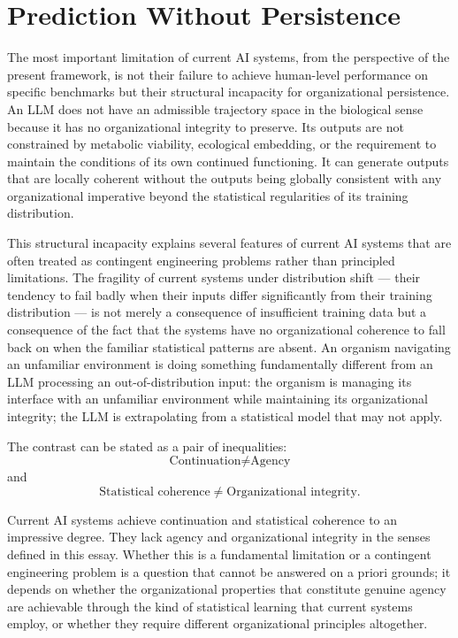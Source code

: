 \documentclass[12pt,a4paper]{report}
\theoremstyle{flyxion}
\begin{document}
\section{Prediction Without Persistence}

The most important limitation of current AI systems, from the perspective of the present framework, is not their failure to achieve human-level performance on specific benchmarks but their structural incapacity for organizational persistence. An LLM does not have an admissible trajectory space in the biological sense because it has no organizational integrity to preserve. Its outputs are not constrained by metabolic viability, ecological embedding, or the requirement to maintain the conditions of its own continued functioning. It can generate outputs that are locally coherent without the outputs being globally consistent with any organizational imperative beyond the statistical regularities of its training distribution.

This structural incapacity explains several features of current AI systems that are often treated as contingent engineering problems rather than principled limitations. The fragility of current systems under distribution shift --- their tendency to fail badly when their inputs differ significantly from their training distribution --- is not merely a consequence of insufficient training data but a consequence of the fact that the systems have no organizational coherence to fall back on when the familiar statistical patterns are absent. An organism navigating an unfamiliar environment is doing something fundamentally different from an LLM processing an out-of-distribution input: the organism is managing its interface with an unfamiliar environment while maintaining its organizational integrity; the LLM is extrapolating from a statistical model that may not apply.

The contrast can be stated as a pair of inequalities:
\[
\text{Continuation} \neq \text{Agency}
\]
and
\[
\text{Statistical coherence} \neq \text{Organizational integrity}.
\]

Current AI systems achieve continuation and statistical coherence to an impressive degree. They lack agency and organizational integrity in the senses defined in this essay. Whether this is a fundamental limitation or a contingent engineering problem is a question that cannot be answered on a priori grounds; it depends on whether the organizational properties that constitute genuine agency are achievable through the kind of statistical learning that current systems employ, or whether they require different organizational principles altogether.
\end{document}
